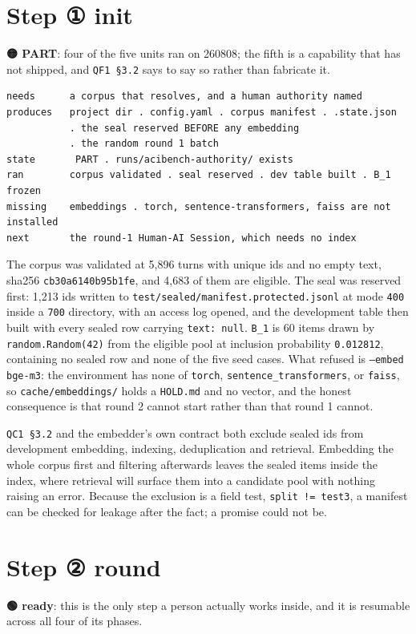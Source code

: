 
\section{Step ① init}
\textbf{🟡 PART}: four of the five units ran on 260808; the fifth is a capability that has not shipped, and \texttt{QF1 §3.2} says to say so rather than fabricate it.

\begin{verbatim}
needs      a corpus that resolves, and a human authority named
produces   project dir . config.yaml . corpus manifest . .state.json
           . the seal reserved BEFORE any embedding
           . the random round 1 batch
state       PART . runs/acibench-authority/ exists
ran        corpus validated . seal reserved . dev table built . B_1 frozen
missing    embeddings . torch, sentence-transformers, faiss are not installed
next       the round-1 Human-AI Session, which needs no index
\end{verbatim}
The corpus was validated at 5,896 turns with unique ids and no empty text, sha256 \texttt{cb30a6140b95b1fe}, and 4,683 of them are eligible. The seal was reserved first: 1,213 ids written to \texttt{test/sealed/manifest.protected.jsonl} at mode \texttt{400} inside a \texttt{700} directory, with an access log opened, and the development table then built with every sealed row carrying \texttt{text: null}. \texttt{B\_1} is 60 items drawn by \texttt{random.Random(42)} from the eligible pool at inclusion probability \texttt{0.012812}, containing no sealed row and none of the five seed cases. What refused is \texttt{--embed bge-m3}: the environment has none of \texttt{torch}, \texttt{sentence\_transformers}, or \texttt{faiss}, so \texttt{cache/embeddings/} holds a \texttt{HOLD.md} and no vector, and the honest consequence is that round 2 cannot start rather than that round 1 cannot.

\texttt{QC1 §3.2} and the embedder's own contract both exclude sealed ids from development embedding, indexing, deduplication and retrieval. Embedding the whole corpus first and filtering afterwards leaves the sealed items inside the index, where retrieval will surface them into a candidate pool with nothing raising an error. Because the exclusion is a field test, \texttt{split != test3}, a manifest can be checked for leakage after the fact; a promise could not be.


\section{Step ② round}
\textbf{🟢 ready}: this is the only step a person actually works inside, and it is resumable across all four of its phases.

